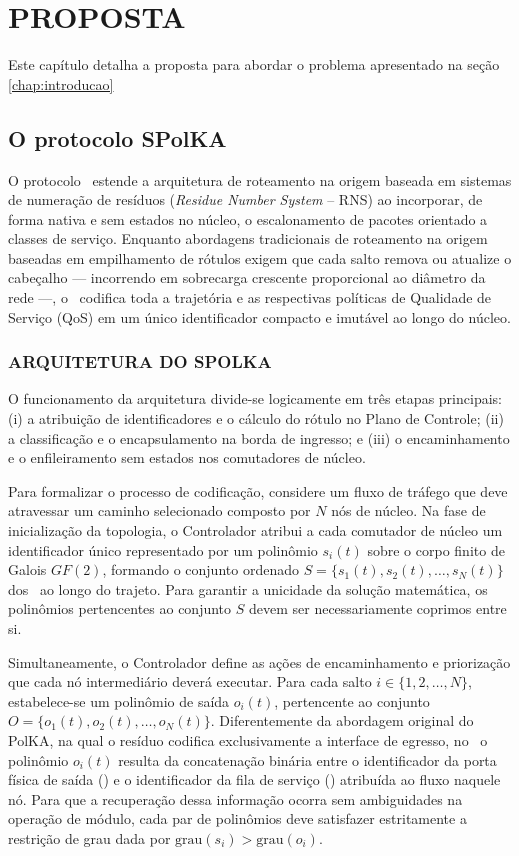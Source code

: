 \chapter{PROPOSTA}
\label{chap:proposta}

Este capítulo detalha a proposta para abordar o problema apresentado na seção \ref{chap:introducao}

\section{O protocolo SPolKA}

O protocolo \nome\ estende a arquitetura de roteamento na origem baseada em sistemas de numeração de resíduos (\textit{Residue Number System} -- RNS) \cite{Shoup:2009,dominicini2020} ao incorporar, de forma nativa e sem estados no núcleo, o escalonamento de pacotes orientado a classes de serviço. Enquanto abordagens tradicionais de roteamento na origem baseadas em empilhamento de rótulos exigem que cada salto remova ou atualize o cabeçalho --- incorrendo em sobrecarga crescente proporcional ao diâmetro da rede ---, o \nome\ codifica toda a trajetória e as respectivas políticas de Qualidade de Serviço (QoS) em um único identificador compacto e imutável ao longo do núcleo.

\subsection{ARQUITETURA DO SPOLKA}

O funcionamento da arquitetura divide-se logicamente em três etapas principais: (i) a atribuição de identificadores e o cálculo do rótulo no Plano de Controle; (ii) a classificação e o encapsulamento na borda de ingresso; e (iii) o encaminhamento e o enfileiramento sem estados nos comutadores de núcleo.

Para formalizar o processo de codificação, considere um fluxo de tráfego que deve atravessar um caminho selecionado composto por $N$ nós de núcleo. Na fase de inicialização da topologia, o Controlador atribui a cada comutador de núcleo um identificador único representado por um polinômio $s_i(t)$ sobre o corpo finito de Galois $GF(2)$, formando o conjunto ordenado $S = \{s_1(t), s_2(t), \ldots, s_N(t)\}$ dos \nodeIDs\ ao longo do trajeto. Para garantir a unicidade da solução matemática, os polinômios pertencentes ao conjunto $S$ devem ser necessariamente coprimos entre si.

Simultaneamente, o Controlador define as ações de encaminhamento e priorização que cada nó intermediário deverá executar. Para cada salto $i \in \{1, 2, \ldots, N\}$, estabelece-se um polinômio de saída $o_i(t)$, pertencente ao conjunto $O = \{o_1(t), o_2(t), \ldots, o_N(t)\}$. Diferentemente da abordagem original do PolKA, na qual o resíduo codifica exclusivamente a interface de egresso, no \nome\ o polinômio $o_i(t)$ resulta da concatenação binária entre o identificador da porta física de saída (\portID) e o identificador da fila de serviço (\qID) atribuída ao fluxo naquele nó. Para que a recuperação dessa informação ocorra sem ambiguidades na operação de módulo, cada par de polinômios deve satisfazer estritamente a restrição de grau dada por $\text{grau}(s_i) > \text{grau}(o_i)$.


